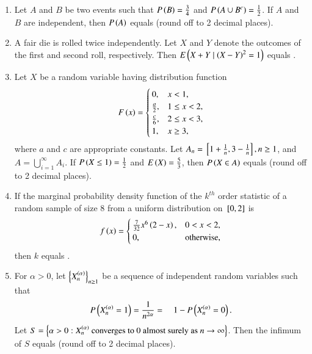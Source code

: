 \documentclass[journal]{IEEEtran}
\begin{document}
\begin{enumerate} 
\item Let $A$ and $B$ be two events such that $P\left(B\right) = \frac{3}{4}$ and $P\left(A \cup B^c\right) = \frac{1}{2}$. If $A$ and $B$ are independent, then $P\left(A\right)$ equals \underline{\hspace{1cm}} (round off to 2 decimal places).

\item A fair die is rolled twice independently. Let $X$ and $Y$ denote the outcomes of the first and second roll, respectively. Then $E\left(X+Y \mid \left(X - Y\right)^2 = 1\right)$ equals \underline{\hspace{1cm}}.

\item Let $X$ be a random variable having distribution function
\begin{align*}
F\left(x\right) = 
\begin{cases}
0, & x < 1, \\
\frac{a}{2}, & 1 \leq x < 2, \\
\frac{c}{6}, & 2 \leq x < 3, \\
1, & x \geq 3,
\end{cases}
\end{align*}
where $a$ and $c$ are appropriate constants. Let $A_n = {}\left[ 1 + \frac{1}{n}, 3 - \frac{1}{n} \right], n \geq 1$, and $A = \bigcup_{i=1}^{\infty} A_i$.
If $P\left(X \leq 1\right) = \frac{1}{2}$ and $E\left(X\right) = \frac{5}{3}$, then $P\left(X \in A\right)$ equals \underline{\hspace{1cm}} (round off to 2 decimal places).

\item If the marginal probability density function of the $k^{th}$ order statistic of a random sample of size 8 from a uniform distribution on ${}\left[0,2\right]$ is
\begin{align*}
f\left(x\right) = 
\begin{cases}
\frac{7}{32} x^6 \left(2 - x\right), & 0 < x < 2, \\
0, & \text{otherwise},
\end{cases}
\end{align*}
then $k$ equals \underline{\hspace{1cm}}.

\item For $\alpha > 0$, let $\left\{ X_n^{\left(\alpha\right)} \right\}_{n\geq1}$ be a sequence of independent random variables such that
\begin{align*}
P\left(X_n^{\left(\alpha\right)} = 1\right) = \frac{1}{n^{2\alpha}} = \quad 1 - P\left(X_n^{\left(\alpha\right)} = 0\right).
\end{align*}
Let $S = \left\{ \alpha > 0 : X_n^{\left(\alpha\right)} \text{ converges to 0 almost surely as } n \to \infty \right\}$.
Then the infimum of $S$ equals \underline{\hspace{1cm}} (round off to 2 decimal places).


\end{enumerate}
\end{document}
